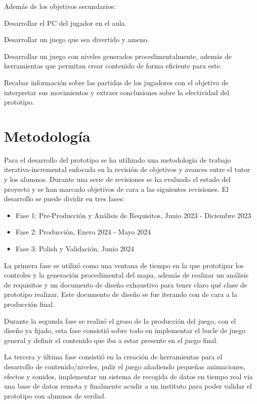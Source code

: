 Además de los objetivos secundarios:
\begin{compactitem}
  \item Desarrollar el PC del jugador en el aula.
  \item Desarrollar un juego que sea divertido y ameno.
  \item Desarrollar un juego con niveles generados procedimentalmente, además de herramientas que permitan crear contenido de forma eficiente para este.
  \item Recabar información sobre las partidas de los jugadores con el objetivo de interpretar sus movimientos y extraer conclusiones sobre la efectividad del prototipo.
\end{compactitem}

\section{Metodología}

Para el desarrollo del prototipo se ha utilizado una metodología de trabajo iterativa-incremental enfocada en la revisión de objetivos y
avances entre el tutor y los alumnos. Durante una serie de revisiones se ha evaluado el estado del proyecto y se han marcado objetivos de cara a las siguientes revisiones. El desarrollo se puede dividir en tres fases: 
\begin{itemize}
	\item Fase 1: Pre-Producción y Análisis de Requisitos, Junio 2023 - Diciembre 2023
	\item Fase 2: Producción, Enero 2024 - Mayo 2024
	\item Fase 3: Polish y Validación, Junio 2024 
\end{itemize}

La primera fase se utilizó como una ventana de tiempo en la que prototipar los controles y la generación procedimental del mapa, además de realizar un análisis de requisitos y un documento de diseño exhaustivo para tener claro qué clase de prototipo realizar. Este documento de diseño se fue iterando con \nombretutor de cara a la producción final.

Durante la segunda fase se realizó el groso de la producción del juego, con el diseño ya fijado, esta fase consistió sobre todo en implementar el bucle de juego general y definir el contenido que iba a estar presente en el juego final.

La tercera y última fase consistió en la creación de herramientas para el desarrollo de contenido/niveles, pulir el juego añadiendo pequeñas animaciones, efectos y sonidos, implementar un sistema de recogida de datos en tiempo real via una base de datos remota y finalmente acudir a un instituto para poder validar el prototipo con alumnos de verdad.

